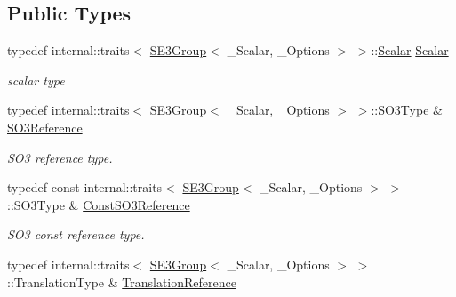 \subsection*{Public Types}
\begin{DoxyCompactItemize}
\item 
typedef internal\+::traits$<$ \hyperlink{class_sophus_1_1_s_e3_group}{S\+E3\+Group}$<$ \+\_\+\+Scalar, \+\_\+\+Options $>$ $>$\+::\hyperlink{class_sophus_1_1_s_e3_group_a8b19ef5ffe83465341b619047581219e}{Scalar} \hyperlink{class_sophus_1_1_s_e3_group_a8b19ef5ffe83465341b619047581219e}{Scalar}\hypertarget{class_sophus_1_1_s_e3_group_a8b19ef5ffe83465341b619047581219e}{}\label{class_sophus_1_1_s_e3_group_a8b19ef5ffe83465341b619047581219e}

\begin{DoxyCompactList}\small\item\em scalar type \end{DoxyCompactList}\item 
typedef internal\+::traits$<$ \hyperlink{class_sophus_1_1_s_e3_group}{S\+E3\+Group}$<$ \+\_\+\+Scalar, \+\_\+\+Options $>$ $>$\+::S\+O3\+Type \& \hyperlink{class_sophus_1_1_s_e3_group_ab9e4d2988d5437bca541db659c76e1a1}{S\+O3\+Reference}\hypertarget{class_sophus_1_1_s_e3_group_ab9e4d2988d5437bca541db659c76e1a1}{}\label{class_sophus_1_1_s_e3_group_ab9e4d2988d5437bca541db659c76e1a1}

\begin{DoxyCompactList}\small\item\em S\+O3 reference type. \end{DoxyCompactList}\item 
typedef const internal\+::traits$<$ \hyperlink{class_sophus_1_1_s_e3_group}{S\+E3\+Group}$<$ \+\_\+\+Scalar, \+\_\+\+Options $>$ $>$\+::S\+O3\+Type \& \hyperlink{class_sophus_1_1_s_e3_group_a448cfe0c4de4a21fe0993472dfc4b981}{Const\+S\+O3\+Reference}\hypertarget{class_sophus_1_1_s_e3_group_a448cfe0c4de4a21fe0993472dfc4b981}{}\label{class_sophus_1_1_s_e3_group_a448cfe0c4de4a21fe0993472dfc4b981}

\begin{DoxyCompactList}\small\item\em S\+O3 const reference type. \end{DoxyCompactList}\item 
typedef internal\+::traits$<$ \hyperlink{class_sophus_1_1_s_e3_group}{S\+E3\+Group}$<$ \+\_\+\+Scalar, \+\_\+\+Options $>$ $>$\+::Translation\+Type \& \hyperlink{class_sophus_1_1_s_e3_group_aecdd5e06df99e50282dbef24632ec622}{Translation\+Reference}\hypertarget{class_sophus_1_1_s_e3_group_aecdd5e06df99e50282dbef24632ec622}{}\label{class_sophus_1_1_s_e3_group_aecdd5e06df99e50282dbef24632ec622}


\end{DoxyCompactItemize}

